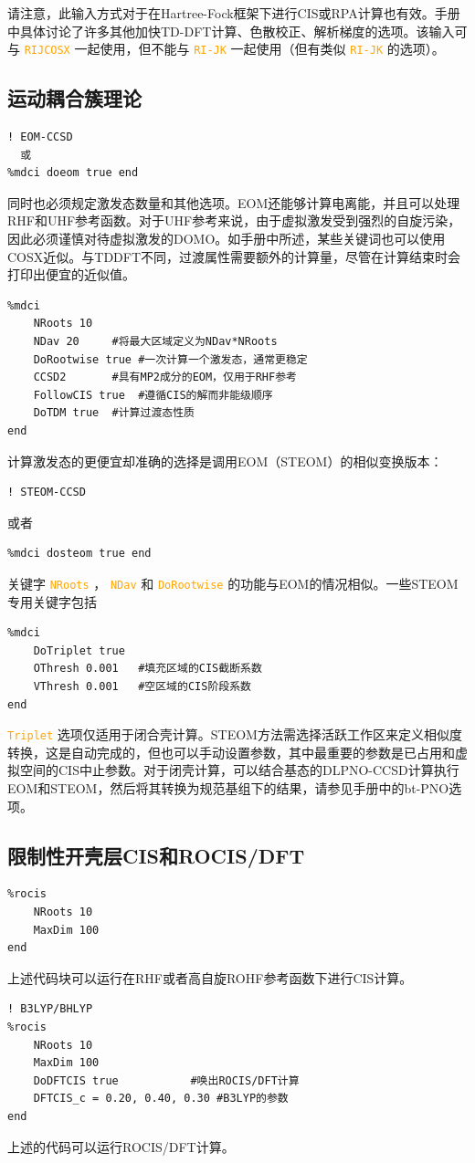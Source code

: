 \documentclass{ctexart}
\newcommand{\cmd}[1]{ \textcolor{orange}{\texttt{#1}} }
\begin{document}
	请注意，此输入方式对于在Hartree-Fock框架下进行CIS或RPA计算也有效。手册中具体讨论了许多其他加快TD-DFT计算、色散校正、解析梯度的选项。该输入可与\cmd{RIJCOSX}一起使用，但不能与\cmd{RI-JK}一起使用（但有类似\cmd{RI-JK}的选项）。
	
	\subsection{运动耦合簇理论} 
	\begin{lstlisting}
! EOM-CCSD
  或
%mdci doeom true end
	\end{lstlisting}
	
	同时也必须规定激发态数量和其他选项。EOM还能够计算电离能，并且可以处理RHF和UHF参考函数。对于UHF参考来说，由于虚拟激发受到强烈的自旋污染，因此必须谨慎对待虚拟激发的DOMO。如手册中所述，某些关键词也可以使用COSX近似。与TDDFT不同，过渡属性需要额外的计算量，尽管在计算结束时会打印出便宜的近似值。
	\begin{lstlisting}
%mdci	
	NRoots 10
	NDav 20		#将最大区域定义为NDav*NRoots
	DoRootwise true	#一次计算一个激发态，通常更稳定
	CCSD2		#具有MP2成分的EOM，仅用于RHF参考 
	FollowCIS true	#遵循CIS的解而非能级顺序
	DoTDM true	#计算过渡态性质
end
	\end{lstlisting}
	
	计算激发态的更便宜却准确的选择是调用EOM（STEOM）的相似变换版本：
	\begin{lstlisting}
! STEOM-CCSD
	\end{lstlisting}
	或者
	\begin{lstlisting}
%mdci dosteom true end
	\end{lstlisting}
	关键字\cmd{NRoots}，\cmd{NDav}和\cmd{DoRootwise}的功能与EOM的情况相似。一些STEOM专用关键字包括
	\begin{lstlisting}
%mdci	
	DoTriplet true	 
	OThresh 0.001	#填充区域的CIS截断系数
	VThresh 0.001	#空区域的CIS阶段系数
end
	\end{lstlisting}
	
	\cmd{Triplet}选项仅适用于闭合壳计算。STEOM方法需选择活跃工作区来定义相似度转换，这是自动完成的，但也可以手动设置参数，其中最重要的参数是已占用和虚拟空间的CIS中止参数。对于闭壳计算，可以结合基态的DLPNO-CCSD计算执行EOM和STEOM，然后将其转换为规范基组下的结果，请参见手册中的bt-PNO选项。
	
	\subsection{限制性开壳层CIS和ROCIS/DFT} 
	\begin{lstlisting}
%rocis 
	NRoots 10
	MaxDim 100
end
	\end{lstlisting}
	上述代码块可以运行在RHF或者高自旋ROHF参考函数下进行CIS计算。
	\begin{lstlisting}
! B3LYP/BHLYP
%rocis 
	NRoots 10
	MaxDim 100
	DoDFTCIS true			#唤出ROCIS/DFT计算
	DFTCIS_c = 0.20, 0.40, 0.30	#B3LYP的参数
end
	\end{lstlisting}
	上述的代码可以运行ROCIS/DFT计算。
	
\end{document}
